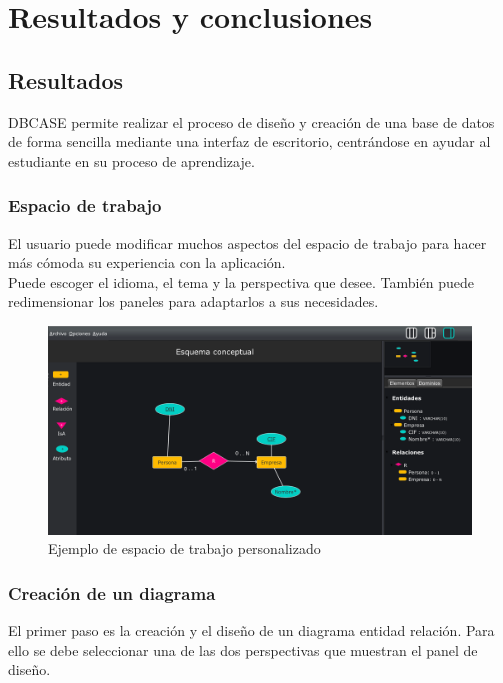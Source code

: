 \chapter{Resultados y conclusiones}
\section{Resultados}
DBCASE permite realizar el proceso de diseño y creación de una base de datos de forma sencilla mediante una interfaz de escritorio, centrándose en ayudar al estudiante en su proceso de aprendizaje.\\

\subsection*{Espacio de trabajo}
El usuario puede modificar muchos aspectos del espacio de trabajo para hacer más cómoda su experiencia con la aplicación.\\

Puede escoger el idioma, el tema y la perspectiva que desee. También puede redimensionar los paneles para adaptarlos a sus necesidades.
\begin{figure}[H]
    \centering
    \includegraphics[width=1\textwidth]{img/black.png}
    \caption{Ejemplo de espacio de trabajo personalizado}
\end{figure}

\subsection*{Creación de un diagrama}
El primer paso es la creación y el diseño de un diagrama entidad relación. Para ello se debe seleccionar una de las dos perspectivas que muestran el panel de diseño.\\

